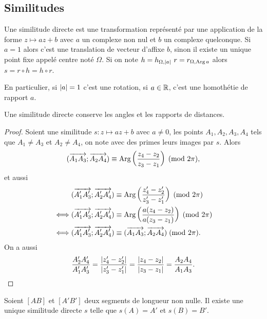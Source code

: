 \subsection{Similitudes}

Une similitude directe est une transformation représenté par une application de la forme \(z \longmapsto az+b\) avec \(a\) un complexe non nul et \(b\) un complexe quelconque. Si \(a=1\) alors c'est une translation de vecteur d'affixe \(b\), sinon il existe un unique point fixe appelé centre noté \(\Omega\). Si on note \(h=h_{\Omega, \abs{a}} \ r=r_{\Omega, \Arg{a}}\) alors \(s=r \circ h=h \circ r\).

En particulier, si \(\left\lvert a\right\rvert=1\) c'est une rotation, si \(a \in \mathbb{R}\), c'est une homothétie de rapport \(a\).

\begin{prop}
  Une similitude directe conserve les angles et les rapports de distances.
\end{prop}
\begin{proof}
  Soient une similitude \(s : z \longmapsto az+b\) avec \(a \neq 0\), les points \(A_1,A_2,A_3,A_4\) tels que \(A_1 \neq A_3\) et \(A_2 \neq A_4\), on note avec des primes leurs images par \(s\). Alors
  \begin{equation}
    (\overrightarrow{A_1 A_3};\overrightarrow{A_2 A_4}) \equiv \operatorname{Arg}\left(\frac{z_4-z_2}{z_3-z_1}\right)\!\pmod {2\pi},
  \end{equation}
et aussi
\begin{align}
    &(\overrightarrow{A'_1 A'_3};\overrightarrow{A'_2 A'_4}) \equiv \operatorname{Arg}\left(\frac{z'_4-z'_2}{z'_3-z'_1}\right)\!\pmod {2\pi}\\
    \iff&(\overrightarrow{A'_1 A'_3};\overrightarrow{A'_2 A'_4}) \equiv \operatorname{Arg}\left(\frac{a(z_4-z_2)}{a(z_3-z_1)}\right)\!\pmod {2\pi}\\
    \iff&(\overrightarrow{A'_1 A'_3};\overrightarrow{A'_2 A'_4}) \equiv (\overrightarrow{A_1 A_3};\overrightarrow{A_2 A_4})\!\pmod {2\pi}.
  \end{align}
  On a aussi
\begin{equation}
  \frac{A'_2A'_4}{A'_1A'_3}=\frac{\left\lvert z'_4-z'_2\right\rvert}{\left\lvert z'_3-z'_1\right\rvert}=\frac{\left\lvert z_4-z_2\right\rvert}{\left\lvert z_3-z_1\right\rvert}=\frac{A_2A_4}{A_1A_3}.
\end{equation}
\end{proof}

\begin{prop}
  Soient \([AB]\) et \([A'B']\) deux segments de longueur non nulle. Il existe une unique similitude directe \(s\) telle que \(s(A)=A'\) et \(s(B)=B'\).
\end{prop}
\cleardoublepage
